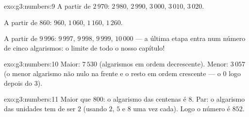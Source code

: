 \begin{solution}{exo:g3:numbers:9}
A partir de $2\,970$: $2\,980$, $2\,990$, $3\,000$, $3\,010$,
$3\,020$.

A partir de $860$: $960$, $1\,060$, $1\,160$, $1\,260$.

A partir de $9\,996$: $9\,997$, $9\,998$, $9\,999$, $10\,000$ --- a
última etapa entra num número de cinco algarismos: o limite de todo
o nosso capítulo!
\end{solution}

\begin{solution}{exo:g3:numbers:10}
Maior: $7\,530$ (algarismos em ordem decrescente). Menor: $3\,057$ (o
menor algarismo não nulo na frente e o resto em ordem crescente ---
o $0$ logo depois do $3$).
\end{solution}

\begin{solution}{exo:g3:numbers:11}
Maior que $800$: o algarismo das centenas é $8$. Par: o algarismo das
unidades tem de ser $2$ (usando $2$, $5$ e $8$ uma vez cada). Logo o
número é $852$.
\end{solution}
